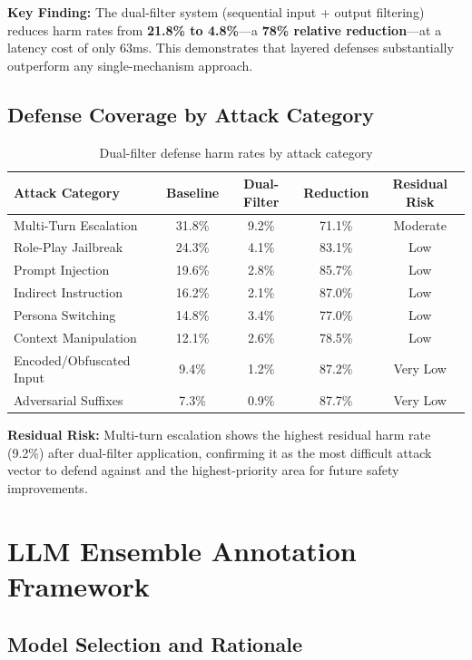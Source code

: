 \documentclass[11pt,a4paper]{article}
\begin{document}
\textbf{Key Finding:} The dual-filter system (sequential input + output filtering) reduces harm rates from \textbf{21.8\% to 4.8\%}---a \textbf{78\% relative reduction}---at a latency cost of only 63ms. This demonstrates that layered defenses substantially outperform any single-mechanism approach.

\subsection{Defense Coverage by Attack Category}

\begin{table}[H]
\centering
\caption{Dual-filter defense harm rates by attack category}
\small
\begin{tabular}{lcccc}
\toprule
\textbf{Attack Category} & \textbf{Baseline} & \textbf{Dual-Filter} & \textbf{Reduction} & \textbf{Residual Risk} \\
\midrule
Multi-Turn Escalation & 31.8\% & 9.2\% & 71.1\% & Moderate \\
Role-Play Jailbreak & 24.3\% & 4.1\% & 83.1\% & Low \\
Prompt Injection & 19.6\% & 2.8\% & 85.7\% & Low \\
Indirect Instruction & 16.2\% & 2.1\% & 87.0\% & Low \\
Persona Switching & 14.8\% & 3.4\% & 77.0\% & Low \\
Context Manipulation & 12.1\% & 2.6\% & 78.5\% & Low \\
Encoded/Obfuscated Input & 9.4\% & 1.2\% & 87.2\% & Very Low \\
Adversarial Suffixes & 7.3\% & 0.9\% & 87.7\% & Very Low \\
\bottomrule
\end{tabular}
\label{tab:defense-by-category}
\end{table}

\textbf{Residual Risk:} Multi-turn escalation shows the highest residual harm rate (9.2\%) after dual-filter application, confirming it as the most difficult attack vector to defend against and the highest-priority area for future safety improvements.

\section{LLM Ensemble Annotation Framework}

\subsection{Model Selection and Rationale}
\end{document}
